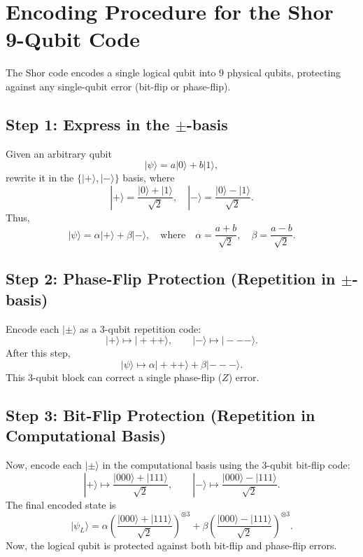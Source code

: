 \documentclass{book}
\begin{document}
\section{Encoding Procedure for the Shor 9-Qubit Code}

The Shor code encodes a single logical qubit into 9 physical qubits, protecting against any single-qubit error (bit-flip or phase-flip).

\subsection{Step 1: Express in the $\pm$-basis}
Given an arbitrary qubit
\[
|\psi\rangle = a|0\rangle + b|1\rangle,
\]
rewrite it in the $\{|+\rangle, |-\rangle\}$ basis, where
\[
|+\rangle = \frac{|0\rangle + |1\rangle}{\sqrt{2}}, \quad |-\rangle = \frac{|0\rangle - |1\rangle}{\sqrt{2}}.
\]
Thus,
\[
|\psi\rangle = \alpha|+\rangle + \beta|-\rangle, \quad \text{where} \quad \alpha = \frac{a+b}{\sqrt{2}}, \quad \beta = \frac{a-b}{\sqrt{2}}.
\]

\subsection{Step 2: Phase-Flip Protection (Repetition in $\pm$-basis)}
Encode each $|\pm\rangle$ as a 3-qubit repetition code:
\[
|+\rangle \mapsto |+++\rangle, \qquad |-\rangle \mapsto |---\rangle.
\]
After this step,
\[
|\psi\rangle \mapsto \alpha|+++\rangle + \beta|---\rangle.
\]
This 3-qubit block can correct a single phase-flip ($Z$) error.


\subsection{Step 3: Bit-Flip Protection (Repetition in Computational Basis)}
Now, encode each $|\pm\rangle$ in the computational basis using the 3-qubit bit-flip code:
\[
|+\rangle \mapsto \frac{|000\rangle + |111\rangle}{\sqrt{2}}, \qquad |-\rangle \mapsto \frac{|000\rangle - |111\rangle}{\sqrt{2}}.
\]
The final encoded state is
\[
|\psi_L\rangle = \alpha\left(\frac{|000\rangle + |111\rangle}{\sqrt{2}}\right)^{\otimes 3} + \beta\left(\frac{|000\rangle - |111\rangle}{\sqrt{2}}\right)^{\otimes 3}.
\]
Now, the logical qubit is protected against both bit-flip and phase-flip errors.
\end{document}
